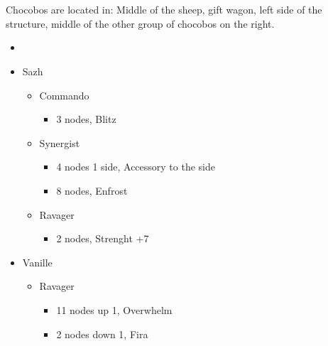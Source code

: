 \documentclass{report}
\begin{document}
\chapter{}

Chocobos are located in: Middle of the sheep, gift wagon, left side of the structure, middle of the other group of chocobos on the right. 

\begin{menu}
\begin{itemize}
    \paradigm
    \begin{itemize}
        \item {}%
{\paradigmline{\textit{\com}}{\textit{\rav}}{}}%
{\paradigmline{\com}{(\med)}{}}%
{\paradigmline{\syn}{\sab}{}}%
{\paradigmline{\rav}{\rav}{}}%
{\paradigmline{\rav}{\sab}{}}%
{\paradigmline{\com}{\sab}{}}
    \end{itemize}
    \crystarium
    \begin{itemize}
        \item Sazh
        \begin{itemize}
            \item Commando
            \begin{itemize}
                \item 3 nodes, Blitz
            \end{itemize}
            \item Synergist
            \begin{itemize}
                \item 4 nodes 1 side, Accessory to the side
                \item 8 nodes, Enfrost
            \end{itemize}
            \item Ravager
            \begin{itemize}
                \item 2 nodes, Strenght +7
            \end{itemize}
        \end{itemize}
        \item Vanille
        \begin{itemize}
            \item Ravager
            \begin{itemize}
                \item 11 nodes up 1, Overwhelm
                \item 2 nodes down 1, Fira

\end{itemize}
\end{itemize}
\end{itemize}
\end{itemize}
\end{menu}
\end{document}
